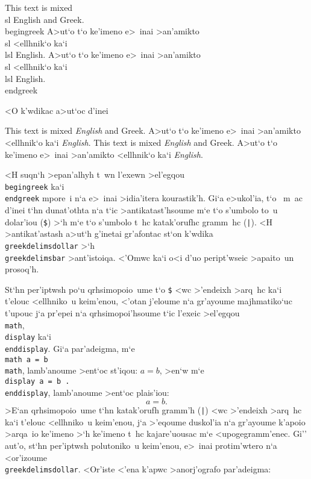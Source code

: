 \beginuser
This text is mixed \lb\\sl English\rb{} and Greek.
\\begingreek
A>ut`o t`o ke'imeno e>~inai >an'amikto \lb\\sl <ellhnik`o\rb{} ka`i
\lb\\lsl English\rb.
A>ut`o t`o ke'imeno e>~inai >an'amikto \lb\\sl <ellhnik`o\rb{} ka`i
\lb\\lsl English\rb.
\\endgreek
\enduser

\noindent
<O k'wdikac a>ut`oc d'inei

{\rm This text is mixed {\sl English} and Greek.} A>ut`o t`o ke'imeno
e>~inai >an'amikto {\tengs <ellhnik`o} ka`i {\sl English}.
{\rm This text is mixed {\sl English} and Greek.} A>ut`o t`o ke'imeno
e>~inai >an'amikto {\tengs <ellhnik`o} ka`i {\sl English}.

<H suqn`h >epan'alhyh t~wn l'exewn >el'egqou {\tt \\begingreek} ka`i
{\tt \\endgreek} mpore~i n`a e>~inai >idia'itera kourastik'h.  Gi`a
e>ukol'ia, t`o \greektex\ m~ac d'inei t`hn dunat'othta n`a t`ic
>anti\-kata\-st'h\-soume m`e t`o s'umbolo to~u dolar'iou ({\tt \$}) >`h
m`e t`o s'umbolo t~hc katak'orufhc gram\-m~hc ({\tt |})\null.   <H
>anti\-kat'a\-stash a>ut`h g'inetai gr'afontac st`on k'wdika {\tt
\\greekdelims\lb dollar\rb} >`h  {\tt \\greekdelims\lb bar\rb}
>ant'i\-stoiqa.  <'Omwc ka`i o<i d'uo peript'wseic >apaito~un prosoq'h. 

St`hn per'iptwsh po`u qrhsimopoio~ume t`o {\tt \$} <wc >'endeixh >arq~hc
ka`i t'elouc <ellhniko~u keim'enou, <'otan j'eloume n`a gr'ayoume
majhmatiko`uc t'upouc j`a pr'epei n`a qrhsimopoi'hsoume t`ic l'exeic
>el'egqou {\tt \\math}, {\tt \\display} ka`i {\tt \\enddisplay}. Gi`a
par'adeigma, m`e {\tt \\math a = b \\math}, lam\-b'a\-noume >ent`oc
st'iqou: $a = b$, >en`w m`e {\tt \\display a = b .\ \\enddisplay},
lam\-b'a\-noume >ent`oc plais'iou:
$$ a = b .$$ 
>E`an qrhsimopoio~ume t`hn katak'orufh gramm'h ({\tt |}) <wc >'endeixh
>arq~hc ka`i t'elouc <ellhniko~u keim'enou, j`a >'eqoume duskol'ia n`a
gr'ayoume k'apoio >arqa~io ke'imeno >`h ke'imeno t~hc kajare'uousac m`e
<upogegramm'enec.  Gi'' aut'o, st`hn per'iptwsh polutoniko~u keim'enou,
e>~inai protim'wtero n`a <or'izoume {\tt \\greekdelims\lb dollar\rb}. 
<Or'iste <'ena k'apwc >anorj'ografo par'adeigma: 

